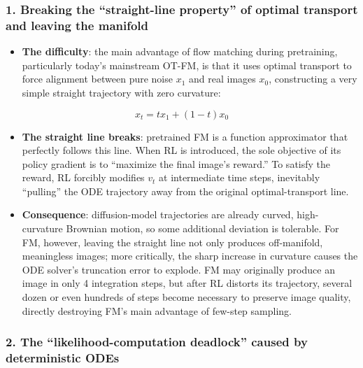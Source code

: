 \hypertarget{breaking-the-straight-line-property-of-optimal-transport-and-leaving-the-manifold}{%
\subsubsection{1. Breaking the ``straight-line property'' of optimal transport and leaving the manifold}\label{breaking-the-straight-line-property-of-optimal-transport-and-leaving-the-manifold}}

\begin{itemize}
\tightlist
\item
  \textbf{The difficulty}: the main advantage of flow matching during pretraining, particularly today's mainstream OT-FM, is that it uses optimal transport to force alignment between pure noise \(x_1\) and real images \(x_0\), constructing a very simple straight trajectory with zero curvature:
\end{itemize}

\[
x_t=t x_1+(1-t)x_0
\]

\begin{itemize}
\tightlist
\item
  \textbf{The straight line breaks}: pretrained FM is a function approximator that perfectly follows this line. When RL is introduced, the sole objective of its policy gradient is to ``maximize the final image's reward.'' To satisfy the reward, RL forcibly modifies \(v_t\) at intermediate time steps, inevitably ``pulling'' the ODE trajectory away from the original optimal-transport line.
\item
  \textbf{Consequence}: diffusion-model trajectories are already curved, high-curvature Brownian motion, so some additional deviation is tolerable. For FM, however, leaving the straight line not only produces off-manifold, meaningless images; more critically, the sharp increase in curvature causes the ODE solver's truncation error to explode. FM may originally produce an image in only 4 integration steps, but after RL distorts its trajectory, several dozen or even hundreds of steps become necessary to preserve image quality, directly destroying FM's main advantage of few-step sampling.
\end{itemize}

\hypertarget{the-likelihood-computation-deadlock-caused-by-deterministic-odes}{%
\subsubsection{2. The ``likelihood-computation deadlock'' caused by deterministic ODEs}\label{the-likelihood-computation-deadlock-caused-by-deterministic-odes}}

